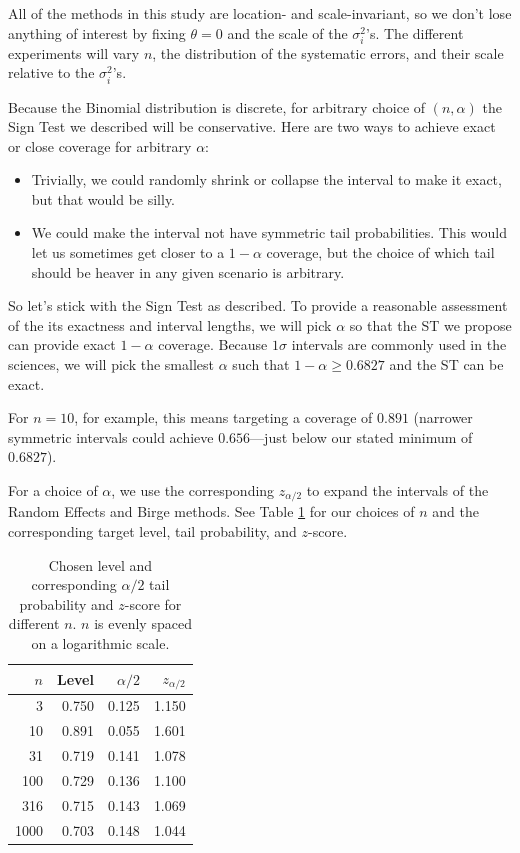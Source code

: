 \documentclass[letterpaper,12pt]{article}
\begin{document}
All of the methods in this study are location- and scale-invariant, so we don't lose anything of interest by fixing $\theta=0$ and the scale of the $\sigma_i^2$'s. The different experiments will vary $n$, the distribution of the systematic errors, and their scale relative to the $\sigma_i^2$'s.

Because the Binomial distribution is discrete, for arbitrary choice of $(n,\alpha)$ the Sign Test we described will be conservative. Here are two ways to achieve exact or close coverage for arbitrary $\alpha$:

\begin{itemize}
\item
  Trivially, we could randomly shrink or collapse the interval to make it exact, but that would be silly.
\item
  We could make the interval not have symmetric tail probabilities. This would let us sometimes get closer to a $1-\alpha$ coverage, but the choice of which tail should be heaver in any given scenario is arbitrary.
\end{itemize}

So let's stick with the Sign Test as described. To provide a reasonable assessment of the its exactness and interval lengths, we will pick $\alpha$ so that the ST we propose can provide exact $1-\alpha$ coverage. Because $1\sigma$ intervals are commonly used in the sciences, we will pick the smallest $\alpha$ such that $1-\alpha\geq 0.6827$ and the ST can be exact.

For $n=10$, for example, this means targeting a coverage of $0.891$ (narrower symmetric intervals could achieve $0.656$---just below our stated minimum of $0.6827$).

For a choice of $\alpha$, we use the corresponding $z_{\alpha/2}$ to expand the intervals of the Random Effects and Birge methods. See Table \ref{tab:table-n} for our choices of $n$ and the corresponding target level, tail probability, and $z$-score.

\begin{table}[htbp]
\centering
\caption{Chosen level and corresponding $\alpha/2$ tail probability and $z$-score for different $n$. $n$ is evenly spaced on a logarithmic scale.}
\label{tab:table-n}
\begin{tabular}{rrrr}
\hline
$n$ & Level & $\alpha/2$ & $z_{\alpha/2}$ \\
\hline
3 & 0.750 & 0.125 & 1.150 \\
10 & 0.891 & 0.055 & 1.601 \\
31 & 0.719 & 0.141 & 1.078 \\
100 & 0.729 & 0.136 & 1.100 \\
316 & 0.715 & 0.143 & 1.069 \\
1000 & 0.703 & 0.148 & 1.044 \\
\hline
\end{tabular}  

\end{table}
\end{document}
